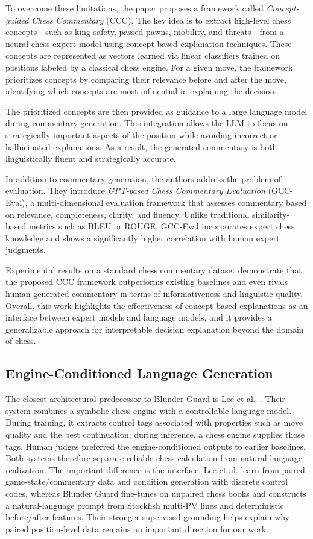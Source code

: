 \documentclass[sigconf,nonacm]{acmart}
\begin{document}
To overcome these limitations, the paper proposes a framework called \textit{Concept-guided Chess Commentary} (CCC). The key idea is to extract high-level chess concepts—such as king safety, passed pawns, mobility, and threats—from a neural chess expert model using concept-based explanation techniques. These concepts are represented as vectors learned via linear classifiers trained on positions labeled by a classical chess engine. For a given move, the framework prioritizes concepts by comparing their relevance before and after the move, identifying which concepts are most influential in explaining the decision.

The prioritized concepts are then provided as guidance to a large language model during commentary generation. This integration allows the LLM to focus on strategically important aspects of the position while avoiding incorrect or hallucinated explanations. As a result, the generated commentary is both linguistically fluent and strategically accurate.

In addition to commentary generation, the authors address the problem of evaluation. They introduce \textit{GPT-based Chess Commentary Evaluation} (GCC-Eval), a multi-dimensional evaluation framework that assesses commentary based on relevance, completeness, clarity, and fluency. Unlike traditional similarity-based metrics such as BLEU or ROUGE, GCC-Eval incorporates expert chess knowledge and shows a significantly higher correlation with human expert judgments.

Experimental results on a standard chess commentary dataset demonstrate that the proposed CCC framework outperforms existing baselines and even rivals human-generated commentary in terms of informativeness and linguistic quality. Overall, this work highlights the effectiveness of concept-based explanations as an interface between expert models and language models, and it provides a generalizable approach for interpretable decision explanation beyond the domain of chess.

\subsection{Engine-Conditioned Language Generation}

The closest architectural predecessor to Blunder Guard is Lee et al.~\cite{lee2022improving}. Their system combines a symbolic chess engine with a controllable language model. During training, it extracts control tags associated with properties such as move quality and the best continuation; during inference, a chess engine supplies those tags. Human judges preferred the engine-conditioned outputs to earlier baselines. Both systems therefore separate reliable chess calculation from natural-language realization. The important difference is the interface: Lee et al. learn from paired game-state/commentary data and condition generation with discrete control codes, whereas Blunder Guard fine-tunes on unpaired chess books and constructs a natural-language prompt from Stockfish multi-PV lines and deterministic before/after features. Their stronger supervised grounding helps explain why paired position-level data remains an important direction for our work.
\end{document}
